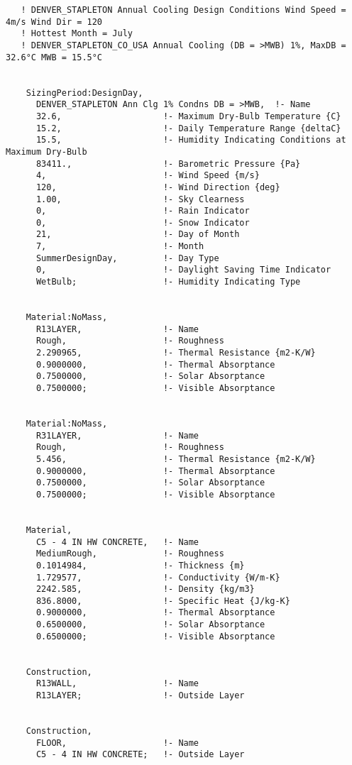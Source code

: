 \begin{lstlisting}
   ! DENVER_STAPLETON Annual Cooling Design Conditions Wind Speed = 4m/s Wind Dir = 120
   ! Hottest Month = July
   ! DENVER_STAPLETON_CO_USA Annual Cooling (DB = >MWB) 1%, MaxDB = 32.6°C MWB = 15.5°C


    SizingPeriod:DesignDay,
      DENVER_STAPLETON Ann Clg 1% Condns DB = >MWB,  !- Name
      32.6,                    !- Maximum Dry-Bulb Temperature {C}
      15.2,                    !- Daily Temperature Range {deltaC}
      15.5,                    !- Humidity Indicating Conditions at Maximum Dry-Bulb
      83411.,                  !- Barometric Pressure {Pa}
      4,                       !- Wind Speed {m/s}
      120,                     !- Wind Direction {deg}
      1.00,                    !- Sky Clearness
      0,                       !- Rain Indicator
      0,                       !- Snow Indicator
      21,                      !- Day of Month
      7,                       !- Month
      SummerDesignDay,         !- Day Type
      0,                       !- Daylight Saving Time Indicator
      WetBulb;                 !- Humidity Indicating Type


    Material:NoMass,
      R13LAYER,                !- Name
      Rough,                   !- Roughness
      2.290965,                !- Thermal Resistance {m2-K/W}
      0.9000000,               !- Thermal Absorptance
      0.7500000,               !- Solar Absorptance
      0.7500000;               !- Visible Absorptance


    Material:NoMass,
      R31LAYER,                !- Name
      Rough,                   !- Roughness
      5.456,                   !- Thermal Resistance {m2-K/W}
      0.9000000,               !- Thermal Absorptance
      0.7500000,               !- Solar Absorptance
      0.7500000;               !- Visible Absorptance


    Material,
      C5 - 4 IN HW CONCRETE,   !- Name
      MediumRough,             !- Roughness
      0.1014984,               !- Thickness {m}
      1.729577,                !- Conductivity {W/m-K}
      2242.585,                !- Density {kg/m3}
      836.8000,                !- Specific Heat {J/kg-K}
      0.9000000,               !- Thermal Absorptance
      0.6500000,               !- Solar Absorptance
      0.6500000;               !- Visible Absorptance


    Construction,
      R13WALL,                 !- Name
      R13LAYER;                !- Outside Layer


    Construction,
      FLOOR,                   !- Name
      C5 - 4 IN HW CONCRETE;   !- Outside Layer



\end{lstlisting}
